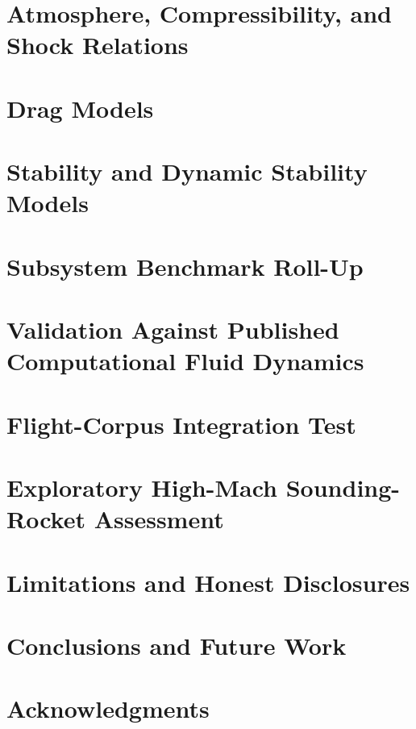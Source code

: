 \documentclass[journal]{new-aiaa}
\begin{document}
\section{Atmosphere, Compressibility, and Shock Relations}\label{sec:atmosphere}


\section{Drag Models}\label{sec:drag}


\section{Stability and Dynamic Stability Models}\label{sec:stability}


\section{Subsystem Benchmark Roll-Up}\label{sec:benchmarks}


\section{Validation Against Published Computational Fluid Dynamics}\label{sec:cfd}


\section{Flight-Corpus Integration Test}\label{sec:corpus}


\section{Exploratory High-Mach Sounding-Rocket Assessment}\label{sec:exploratory}\label{sec:hypersonic}


\section{Limitations and Honest Disclosures}\label{sec:limitations}


\section{Conclusions and Future Work}\label{sec:conclusions}


\section*{Acknowledgments}


\end{document}
